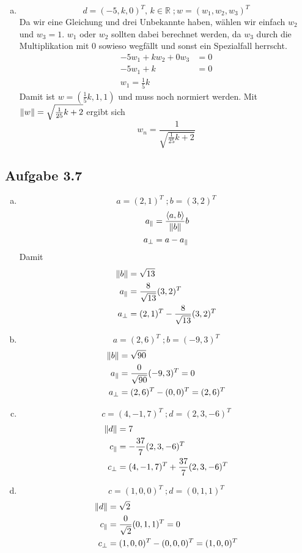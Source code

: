 \documentclass{standalone}
\begin{document}
\begin{enumerate}[a)]
    \item $$ d = (-5,k,0)^T, \, k \in \mathbb{R} \; ; w = (w_1,w_2,w_3)^T $$
    Da wir eine Gleichung und drei Unbekannte haben, wählen wir einfach $w_2$ und $w_3 = 1$. $w_1$ oder $w_2$ sollten dabei berechnet werden, da $w_3$ durch die Multiplikation mit 0 sowieso wegfällt und sonst ein Spezialfall herrscht. 
    \begin{align}
        -5w_1 + kw_2 + 0w_3 &= 0 \\
        -5w_1 + k &= 0 \\
        w_1 = \frac{1}{5}k
    \end{align}
    Damit ist $w = (\frac{1}{5}k,1,1)$ und muss noch normiert werden. Mit $\left\lVert w\right\rVert = \sqrt{\frac{1}{25}k + 2}$ ergibt sich
    $$ w_n = \frac{1}{\sqrt{\frac{1}{25}k + 2}}$$
\end{enumerate}

\subsection{Aufgabe 3.7}
\begin{enumerate}[a)]
    \item $$a = (2,1)^T\; ; b = (3,2)^T$$
    \begin{align}
        a_{\parallel} &= \frac{\langle a,b\rangle}{\left\lVert b\right\rVert}b \\
        a_{\bot} &= a - a_{\parallel}
    \end{align}
    Damit 
    \begin{align}
        \left\lVert b\right\rVert &= \sqrt{13} \\
        a_{\parallel} &= \frac{8}{\sqrt{13}}(3,2)^T \\
        a_{\bot} &= (2,1)^T - \frac{8}{\sqrt{13}}(3,2)^T
    \end{align}

    \item $$a = (2,6)^T\; ; b = (-9,3)^T$$
    \begin{align}
        \left\lVert b\right\rVert &= \sqrt{90} \\
        a_{\parallel} &= \frac{0}{\sqrt{90}}(-9,3)^T = 0\\
        a_{\bot} &= (2,6)^T - (0,0)^T = (2,6)^T 
    \end{align}

    \item $$c = (4,-1,7)^T\; ; d = (2,3,-6)^T$$
    \begin{align}
        \left\lVert d\right\rVert &= 7 \\
        c_{\parallel} &= -\frac{37}{7}(2,3,-6)^T \\
        c_{\bot} &= (4,-1,7)^T + \frac{37}{7}(2,3,-6)^T
    \end{align}

    \item $$c = (1,0,0)^T\; ; d = (0,1,1)^T$$
    \begin{align}
        \left\lVert d\right\rVert &= \sqrt{2} \\
        c_{\parallel} &= \frac{0}{\sqrt{2}}(0,1,1)^T = 0 \\
        c_{\bot} &= (1,0,0)^T - (0,0,0)^T = (1,0,0)^T
    \end{align}
\end{enumerate}
\end{document}
